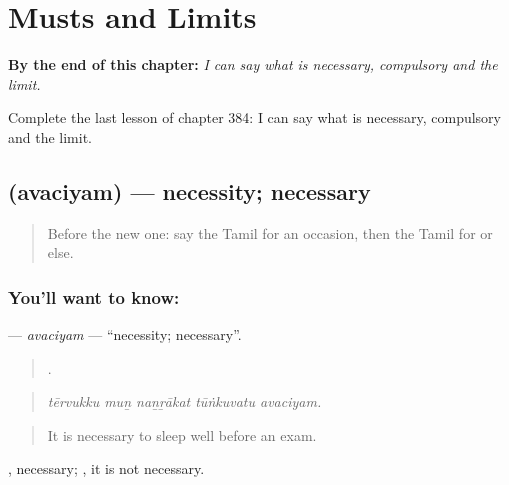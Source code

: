 
\chapter{Musts and Limits}
\label{ch:ta-musts-and-limits}

\begin{chapteropening}
\textbf{By the end of this chapter:} \emph{I can say what is necessary, compulsory and the limit.}

Complete the last lesson of chapter 384: I can say what is necessary, compulsory and the limit.
\end{chapteropening}

\section[\texorpdfstring{\ta{அவசியம்} (avaciyam)}{அவசியம் (avaciyam)}]{ (avaciyam) — necessity; necessary}

\label{lesson:TA-C384-avaciyam}



\begin{quote}
Before the new one: say the Tamil for an occasion, then the Tamil for or else.
\end{quote}

\subsection*{You'll want to know: }
\textbf{} — \emph{avaciyam} — \textquotedblleft{}necessity; necessary\textquotedblright{}.

\begin{quote}
    .
\end{quote}

\begin{quote}
\emph{tērvukku muṉ naṉṟākat tūṅkuvatu avaciyam.}
\end{quote}

\begin{quote}
It is necessary to sleep well before an exam.
\end{quote}

, necessary; , it is not necessary.

